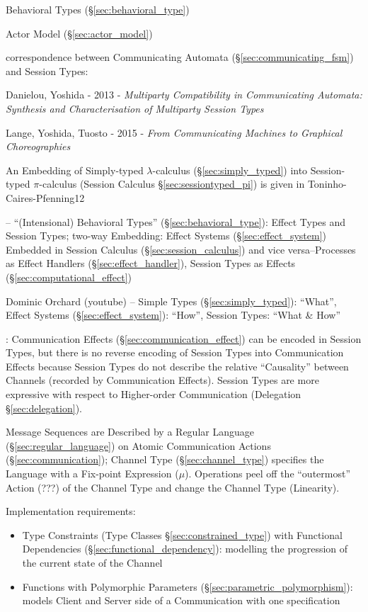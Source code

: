 Behavioral Types (\S\ref{sec:behavioral_type})

\fist Actor Model (\S\ref{sec:actor_model})

\asterism


correspondence between Communicating Automata
(\S\ref{sec:communicating_fsm}) and Session Types:

Danielou, Yoshida - 2013 - \emph{Multiparty Compatibility in
  Communicating Automata: Synthesis and Characterisation of Multiparty
  Session Types}

Lange, Yoshida, Tuosto - 2015 -
\emph{From Communicating Machines to Graphical Choreographies}


\asterism


An Embedding of Simply-typed $\lambda$-calculus
(\S\ref{sec:simply_typed}) into Session-typed $\pi$-calculus (Session
Calculus \S\ref{sec:sessiontyped_pi}) is given in
Toninho-Caires-Pfenning12 \cite{caires-pfenning-toninho12}

\cite{orchard-yoshida16} -- ``(Intensional) Behavioral Types''
(\S\ref{sec:behavioral_type}): Effect Types and Session Types; two-way
Embedding: Effect Systems (\S\ref{sec:effect_system}) Embedded in
Session Calculus (\S\ref{sec:session_calculus}) and vice
versa--Processes as Effect Handlers (\S\ref{sec:effect_handler}),
Session Types as Effects (\S\ref{sec:computational_effect})

Dominic Orchard (youtube) -- Simple Types (\S\ref{sec:simply_typed}):
``What'', Effect Systems (\S\ref{sec:effect_system}): ``How'', Session
Types: ``What \& How''

\cite{orchard-yoshida16}: Communication Effects
(\S\ref{sec:communication_effect}) can be encoded in Session Types,
but there is no reverse encoding of Session Types into Communication
Effects because Session Types do not describe the relative
``Causality'' between Channels (recorded by Communication Effects).
Session Types are more expressive with respect to Higher-order
Communication (Delegation \S\ref{sec:delegation}).

Message Sequences are Described by a Regular Language
(\S\ref{sec:regular_language}) on Atomic Communication Actions
(\S\ref{sec:communication}); Channel Type (\S\ref{sec:channel_type})
specifies the Language with a Fix-point Expression ($\mu$). Operations
peel off the ``outermost'' Action (???) of the Channel Type and change
the Channel Type (Linearity). \cite{neubauer-thiemann04}

Implementation requirements: \cite{neubauer-thiemann04}
\begin{itemize}
  \item Type Constraints (Type Classes \S\ref{sec:constrained_type})
    with Functional Dependencies (\S\ref{sec:functional_dependency}):
    modelling the progression of the current state of the Channel
  \item Functions with Polymorphic Parameters
    (\S\ref{sec:parametric_polymorphism}): models Client and Server
    side of a Communication with one specification
\end{itemize}

